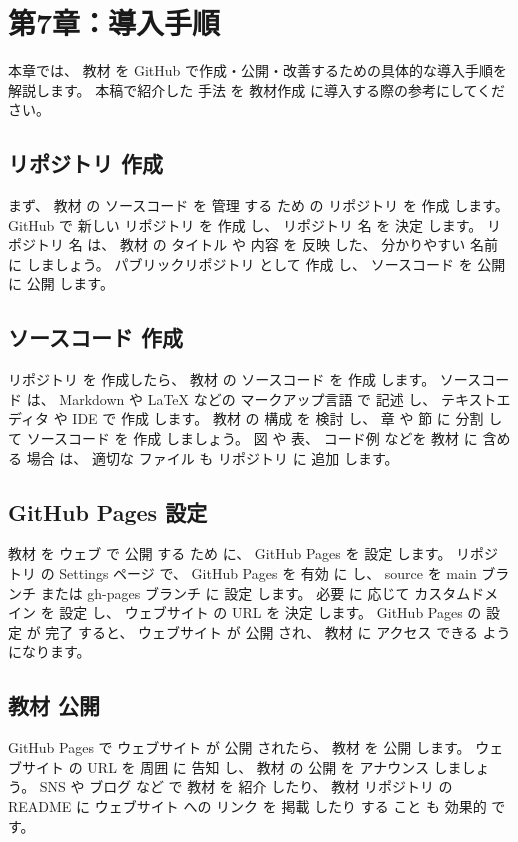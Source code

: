\section{第7章：導入手順}

本章では、 教材 を GitHub で作成・公開・改善するための具体的な導入手順を解説します。
本稿で紹介した 手法 を 教材作成 に導入する際の参考にしてください。

\subsection{ リポジトリ 作成}

まず、 教材 の ソースコード を 管理 する ため の リポジトリ を 作成 します。
GitHub で 新しい リポジトリ を 作成 し、 リポジトリ 名 を 決定 します。
 リポジトリ 名 は、 教材 の タイトル や 内容 を 反映 した、 分かりやすい 名前 に しましょう。
 パブリックリポジトリ として 作成 し、 ソースコード を 公開 に 公開 します。

\subsection{ ソースコード 作成}

 リポジトリ を 作成したら、 教材 の ソースコード を 作成 します。
 ソースコード は、 Markdown や LaTeX などの マークアップ言語 で 記述 し、 テキストエディタ や IDE で 作成 します。
 教材 の 構成 を 検討 し、 章 や 節 に 分割 して ソースコード を 作成 しましょう。
図 や 表、 コード例 などを 教材 に 含める 場合 は、 適切な ファイル も リポジトリ に 追加 します。

\subsection{ GitHub Pages 設定}

 教材 を ウェブ で 公開 する ため に、 GitHub Pages を 設定 します。
 リポジトリ の Settings ページ で、 GitHub Pages を 有効 に し、 source を main ブランチ または gh-pages ブランチ に 設定 します。
必要 に 応じて カスタムドメイン を 設定 し、 ウェブサイト の URL を 決定 します。
GitHub Pages の 設定 が 完了 すると、  ウェブサイト が 公開 され、 教材 に アクセス できる ようになります。

\subsection{ 教材 公開}

 GitHub Pages で ウェブサイト が 公開 されたら、 教材 を 公開 します。
 ウェブサイト の URL を 周囲 に 告知 し、 教材 の 公開 を アナウンス しましょう。
SNS や ブログ など で 教材 を 紹介 したり、 教材 リポジトリ の README に ウェブサイト への リンク を 掲載 したり する こと も 効果的 です。

